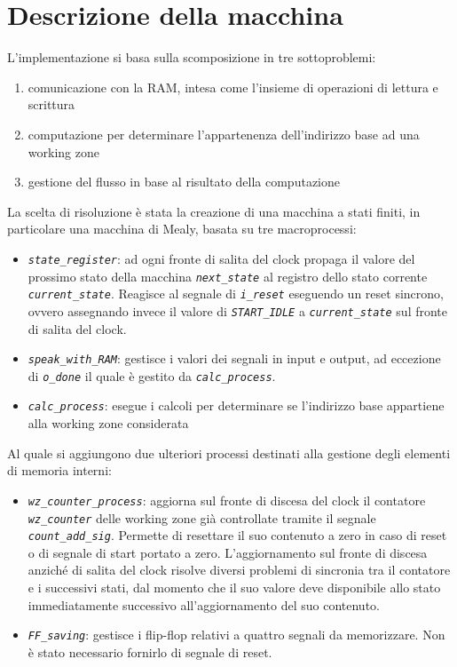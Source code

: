 \documentclass[12pt,a4paper,titlepage]{article}
\begin{document}
	\section{Descrizione della macchina}
		L'implementazione si basa sulla scomposizione in tre sottoproblemi:
		\begin{enumerate}
			\item comunicazione con la RAM, intesa come l'insieme di operazioni di lettura e scrittura
			\item computazione per determinare l'appartenenza dell'indirizzo base ad una working zone
			\item gestione del flusso in base al risultato della computazione
		\end{enumerate}
		La scelta di risoluzione è stata la creazione di una macchina a stati finiti, in particolare una macchina di Mealy, basata su tre macroprocessi:
		\begin{itemize}
			\item \textit{\texttt{state\_register}}: ad ogni fronte di salita del clock propaga il valore del prossimo stato della macchina \textit{\texttt{next\_state}} al registro dello stato corrente \textit{\texttt{current\_state}}. Reagisce al segnale di \textit{\texttt{i\_reset}} eseguendo un reset sincrono, ovvero assegnando invece il valore di \textit{\texttt{START\_IDLE}} a \textit{\texttt{current\_state}} sul fronte di salita del clock.
			\item \textit{\texttt{speak\_with\_RAM}}: gestisce i valori dei segnali in input e output, ad eccezione di \textit{\texttt{o\_done}} il quale è gestito da \textit{\texttt{calc\_process}}.
			\item \textit{\texttt{calc\_process}}: esegue i calcoli per determinare se l'indirizzo base appartiene alla working zone considerata
		\end{itemize}
		Al quale si aggiungono due ulteriori processi destinati alla gestione degli elementi di memoria interni:
		\begin{itemize}
			\item \textit{\texttt{wz\_counter\_process}}: aggiorna sul fronte di discesa del clock il contatore \textit{\texttt{wz\_counter}} delle working zone già controllate tramite il segnale \textit{\texttt{count\_add\_sig}}. Permette di resettare il suo contenuto a zero in caso di reset o di segnale di start portato a zero. L'aggiornamento sul fronte di discesa anziché di salita del clock risolve diversi problemi di sincronia tra il contatore e i successivi stati, dal momento che il suo valore deve disponibile allo stato immediatamente successivo all'aggiornamento del suo contenuto.
			\item \textit{\texttt{FF\_saving}}: gestisce i flip-flop relativi a quattro segnali da memorizzare. Non è stato necessario fornirlo di segnale di reset.
		\end{itemize}
		
\end{document}
